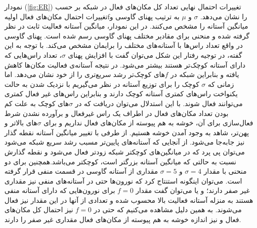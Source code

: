 نمودار (\ref{fig:ER}) تغییرات احتمال  نهایی تعداد کل مکان‌های فعال  در شبکه بر حسب تغییرات احتمال مکان‌های فعال اولیهfرا نشان می‌دهد. $\sigma$ و $\mu$ به ترتیب پهنای گاوسی و میانگین آستانه را مشخص می‌کنند.  در این نمودار، میانگین آستانه فعالیت  ثابت در نظر گرفته شده و منحنی برای مقادیر مختلف پهنای گاوسی رسم شده است. پهنای گاوسی در واقع تعداد راس‌ها با آستانه‌های مختلف را برایمان مشخص می‌کند. با توجه به این گفته، در توجیه رفتار این شکل می‌توان گفت با افزایش پهنای $\sigma$، تعداد راس‌هایی که دارای آستانه کوچک‌تر هستند بیشتر می‌شود. در نتیجه  آستانه‌ی فعالیت مکان‌ها کاهش یافته و بنابراین شبکه در ‌$f$های کوچک‌تر رشد سریع‌تری را از خود نشان می‌دهد.  اما زمانی که $\sigma$ کوچک را برای توزیع آستانه در نظر می‌گیریم با نزدیک شدن به حالت یکنواخت راس‌های کمتری آستانه کوچک دارند و بنابراین راس‌های غیر فعال کمتری می‌توانند فعال شوند. با این استدلال می‌توان دریافت که در  $\sigma$های کوچک به علت کم بودن تعداد مکان‌های فعال  در اطراف یک راس‌ غیرفعال و برآورده نشدن شرط فعال‌سازی برای آن، خوشه به هم پیوسته از مکان‌های فعال نداریم و برای  $\sigma$های بالاتر و پهن‌تر، شاهد به  وجود آمدن خوشه هستیم. از طرفی با تغییر میانگین آستانه نقطه گذار نیز جابه‌جا می‌شود. از آنجایی که آستانه‌های پایین‌تر مسبب رشد سریع شبکه می‌شود می‌توان پی پرد که در میانگین‌های کوچکتر شبکه زودتر فعال می‌شود و نقطه گذارش نسبت به حالتی که میانگین آستانه بزرگتر است، کوچکتر می‌باشد.همچنین برای دو منحنی با مقدار $\sigma = 4$  و  $\sigma = 5$ مقداری از آستانه گاوسی در قسمت منفی قرار گرفته است. می‌توان اینگونه استنتاج کرد که نورون‌ها حتی در آستانه‌های منفی نیز مقداری غیر صفر دارند؛ و یا می‌توان گفت مقدار $f = 0$  برای نورون‌هایی که دارای آستانه منفی هستند به منزله آستانه فعالیت بالا محسوب شده و تعدادی از آنها در این مقدار نیز فعال می‌شوند. به همین دلیل مشاهده می‌کنیم که حتی در  $f = 0$ نیز احتمال کل مکان‌های فعال و نیز اندازه خوشه به هم پیوسته از مکان‌های فعال مقداری غیر صفر را دارند.


